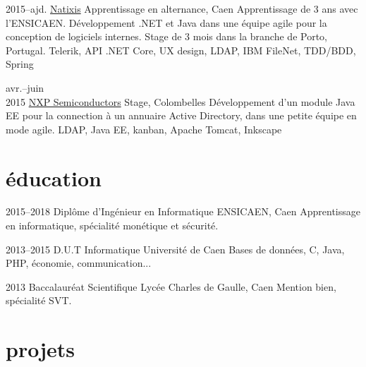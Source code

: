 \documentclass[]{friggeri-cv}
\begin{document}
\begin{entrylist}
    \entry
    {2015--ajd.}
    {\href{https://www.natixis.com}{Natixis}}
    {Apprentissage en alternance, Caen}
    {Apprentissage de 3 ans avec l’ENSICAEN. Développement \csharp .NET et Java dans une équipe agile pour la conception de logiciels internes. Stage de 3 mois dans la branche de Porto, Portugal.}
    {Telerik, API .NET Core, UX design, LDAP, IBM FileNet, TDD/BDD, Spring}
    
    \entry
    {avr.--juin\\2015}
    {\href{https://www.nxp.com}{NXP Semiconductors}}
    {Stage, Colombelles}
    {Développement d’un module Java EE pour la connection à un annuaire Active Directory, dans une petite équipe en mode agile.}
    {LDAP, Java EE, kanban, Apache Tomcat, Inkscape}
\end{entrylist}

\section{éducation}

\begin{entrylist}
    \entry
    {2015--2018}
    {Diplôme d’Ingénieur {\normalfont en Informatique}}
    {ENSICAEN, Caen}
    {Apprentissage en informatique, spécialité monétique et sécurité.}{}
    
    \entry
    {2013--2015}
    {D.U.T {\normalfont Informatique}}
    {Université de Caen}
    {Bases de données, C, Java, PHP, économie, communication...}{}
    
    \entry
    {2013}
    {Baccalauréat {\normalfont Scientifique}}
    {Lycée Charles de Gaulle, Caen}
    {Mention bien, spécialité SVT.}{}
\end{entrylist}

\section{projets}
\end{document}
